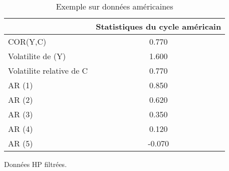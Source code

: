 \begin{table}[H] 
\begin{center}  
\caption{Exemple sur données américaines} 
\begin{tabular}{lc}
\toprule \toprule 
& Statistiques du cycle américain \\ \midrule
COR(Y,C) & 0.770 \\
Volatilite de (Y) & 1.600 \\
Volatilite relative de C & 0.770 \\
AR (1) & 0.850 \\
AR (2) & 0.620 \\
AR (3) & 0.350 \\
AR (4) & 0.120 \\
AR (5) & -0.070 \\ \bottomrule \bottomrule
\end{tabular} 
\end{center} 
\end{table} 
\vspace{-3em} 
\begin{footnotesize} 
\flushleft 
Données HP filtrées.
\end{footnotesize}
